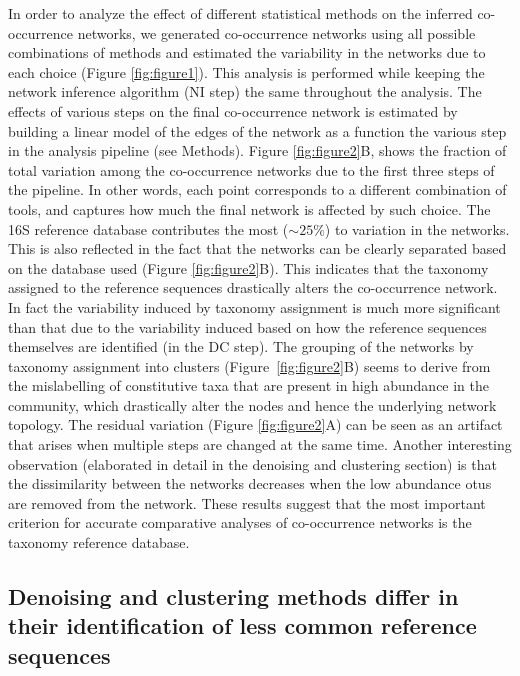   In order to analyze the effect of different statistical methods on the inferred co-occurrence networks, we generated co-occurrence networks using all possible combinations of methods and estimated the variability in the networks due to each choice (Figure \ref{fig:figure1}).
  This analysis is performed while keeping the network inference algorithm (NI step) the same throughout the analysis.
  The effects of various steps on the final co-occurrence network is estimated by building a linear model of the edges of the network as a function the various step in the analysis pipeline (see Methods).
  Figure \ref{fig:figure2}B, shows the fraction of total variation among the co-occurrence networks due to the first three steps of the pipeline. In other words, each point corresponds to a different combination of tools, and captures how much the final network is affected by such choice.
  The 16S reference database contributes the most ($\sim25\%$) to variation in the networks. This is also reflected in the fact that the networks can be clearly separated based on the database used (Figure \ref{fig:figure2}B).
  This indicates that the taxonomy assigned to the reference sequences drastically alters the co-occurrence network.
  In fact the variability induced by taxonomy assignment is much more significant than that due to the variability induced based on how the reference sequences themselves are identified (in the DC step).
  The grouping of the networks by taxonomy assignment into clusters (Figure~\ref{fig:figure2}B) seems to derive from the mislabelling of constitutive taxa that are present in high abundance in the community, which drastically alter the nodes and hence the underlying network topology.
  The residual variation (Figure \ref{fig:figure2}A) can be seen as an artifact that arises when multiple steps are changed at the same time.
  Another interesting observation (elaborated in detail in the denoising and clustering section) is that the dissimilarity between the networks decreases when the low abundance \ac{otu}s are removed from the network.
  These results suggest that the most important criterion for accurate comparative analyses of co-occurrence networks is the taxonomy reference database.

  \FloatBarrier

  \subsection*{Denoising and clustering methods differ in their identification of less common reference sequences}

